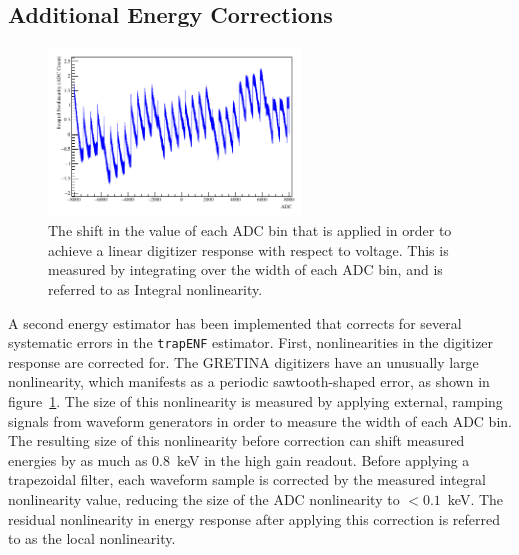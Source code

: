 \documentclass[/main.tex]{subfiles}
\begin{document}
\subsection{Additional Energy Corrections}
\begin{figure}
  \centering
  \includegraphics[width=0.6\textwidth]{dignonlin}
  \caption[Integral digitizer nonlinearity]{\label{fig:localnonlin}
    The shift in the value of each ADC bin that is applied in order to achieve a linear digitizer response with respect to voltage. This is measured by integrating over the width of each ADC bin, and is referred to as Integral nonlinearity.
  }
\end{figure}
A second energy estimator has been implemented that corrects for several systematic errors in the \texttt{trapENF} estimator\cite{energyunidoc}.
First, nonlinearities in the digitizer response are corrected for.
The GRETINA digitizers have an unusually large nonlinearity, which manifests as a periodic sawtooth-shaped error, as shown in figure~\ref{fig:localnonlin}.
The size of this nonlinearity is measured by applying external, ramping signals from waveform generators in order to measure the width of each ADC bin.
The resulting size of this nonlinearity before correction can shift measured energies by as much as 0.8~keV in the high gain readout.
Before applying a trapezoidal filter, each waveform sample is corrected by the measured integral nonlinearity value, reducing the size of the ADC nonlinearity to $<0.1$~keV.
The residual nonlinearity in energy response after applying this correction is referred to as the local nonlinearity.
\\
\end{document}

